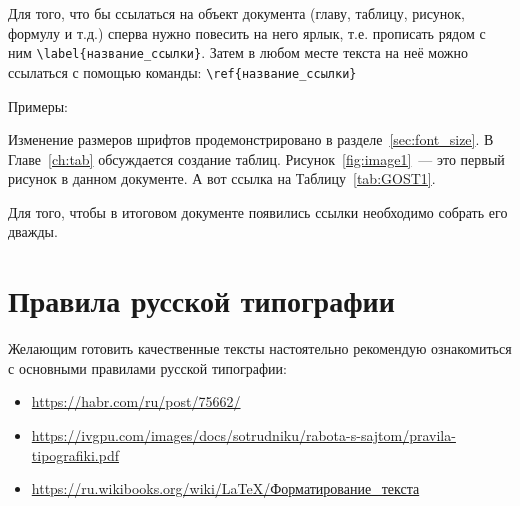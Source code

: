 Для того, что бы ссылаться на объект документа (главу, таблицу, рисунок, формулу и т.д.) сперва нужно повесить на него ярлык, т.е. прописать рядом с ним \verb*|\label{название_ссылки}|. Затем в любом месте текста на неё можно ссылаться с помощью команды: \verb*|\ref{название_ссылки}|

Примеры:

Изменение размеров шрифтов продемонстрировано в разделе~\ref{sec:font_size}. В Главе~\ref{ch:tab} обсуждается создание таблиц. Рисунок~\ref{fig:image1}~--- это первый рисунок в данном документе. А вот ссылка на Таблицу~\ref{tab:GOST1}.

Для того, чтобы в итоговом документе появились ссылки необходимо собрать его дважды.

\section{Правила русской типографии}

Желающим готовить качественные тексты настоятельно рекомендую ознакомиться с основными правилами русской типографии:

\begin{itemize}
	\item \href{https://habr.com/ru/post/75662/}{https://habr.com/ru/post/75662/}
	\item \href{https://ivgpu.com/images/docs/sotrudniku/rabota-s-sajtom/pravila-tipografiki.pdf}{\small https://ivgpu.com/images/docs/sotrudniku/rabota-s-sajtom/pravila-tipografiki.pdf}
	\item \href{https://ru.wikibooks.org/wiki/LaTeX/%D0%A4%D0%BE%D1%80%D0%BC%D0%B0%D1%82%D0%B8%D1%80%D0%BE%D0%B2%D0%B0%D0%BD%D0%B8%D0%B5_%D1%82%D0%B5%D0%BA%D1%81%D1%82%D0%B0}{https://ru.wikibooks.org/wiki/LaTeX/Форматирование\_текста}
\end{itemize}

